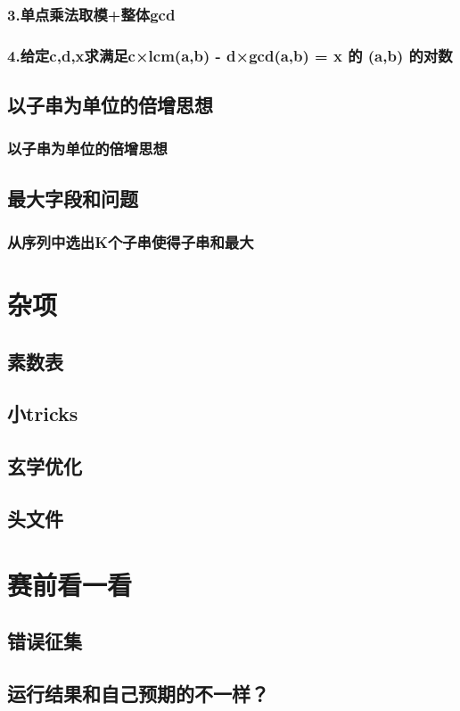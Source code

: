 \documentclass[10pt,a4paper]{article}
\begin{document}
\subsubsection{3.单点乘法取模+整体gcd}

\subsubsection{4.给定c,d,x求满足c×lcm(a,b) - d×gcd(a,b) = x 的 (a,b) 的对数}

\subsection{以子串为单位的倍增思想}
\subsubsection{以子串为单位的倍增思想}

\subsection{最大字段和问题}
\subsubsection{从序列中选出K个子串使得子串和最大}

\section{杂项}
\subsection{素数表}

\subsection{小tricks}

\subsection{玄学优化}

\subsection{头文件}

\section{赛前看一看}
\subsection{错误征集}

\subsection{运行结果和自己预期的不一样？}

\end{document}
